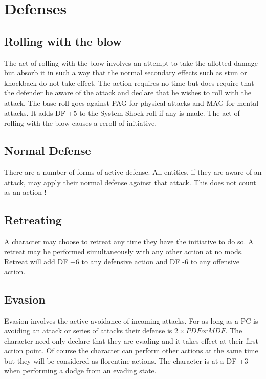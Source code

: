 \section{Defenses}

\subsection{Rolling with the blow}

The act of rolling with the blow involves an attempt to take the
allotted damage but absorb it in such a way that the normal secondary
effects such as stun or knockback do not take effect. The action
requires no time but does require that the defender be aware of the
attack and declare that he wishes to roll with the attack. The base
roll goes against PAG for physical attacks and MAG for mental
attacks. It adds DF +5 to the System Shock roll if any is made.
The act of rolling with the blow causes a reroll of initiative.

\subsection{Normal Defense}

There are a number of forms of active defense. All entities, if they
are aware of an attack, may apply their normal defense against that
attack. This does not count as an action !

\subsection{Retreating}

A character may choose to retreat any time they have the initiative to do so.
A retreat may be performed simultaneously with any other action at no mods.
Retreat will add DF +6 to any defensive action and DF -6 to any offensive action.

\subsection{Evasion}

Evasion involves the active avoidance of incoming attacks. For as long
as a PC is avoiding an attack or series of attacks their defense is \( 2
\times PDF or MDF \). The character need only declare that they are evading and it takes effect at
their first action point. Of course the character can perform other actions
at the same time but they will be considered as florentine actions. The
character is at a DF +3 when performing a dodge from an evading state.

